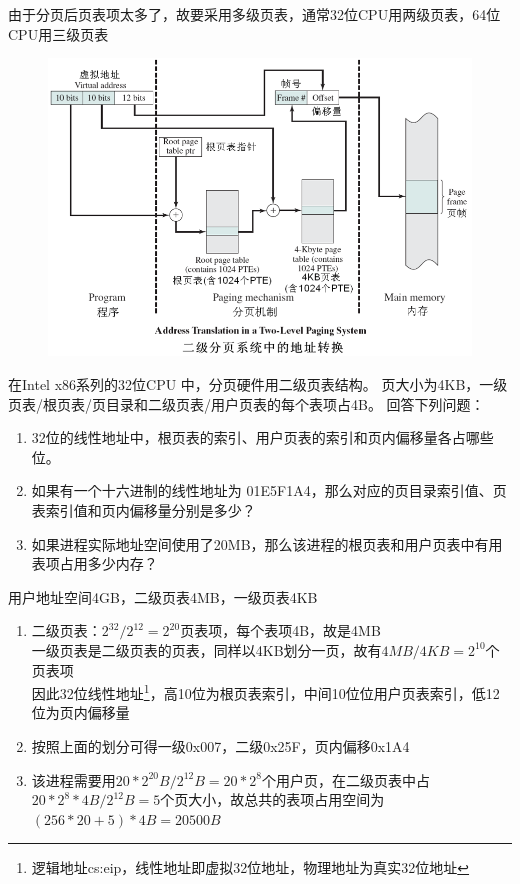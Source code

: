 由于分页后页表项太多了，故要采用多级页表，通常32位CPU用两级页表，64位CPU用三级页表
\begin{figure}[H]
    \centering
    \includegraphics[width=0.6\linewidth]{fig/two-level_paging.png}
\end{figure}
\begin{example}
    在Intel x86系列的32位CPU 中，分页硬件用二级页表结构。
    页大小为4KB，一级页表/根页表/页目录和二级页表/用户页表的每个表项占4B。
    回答下列问题：
    \begin{enumerate}
        \item 32位的线性地址中，根页表的索引、用户页表的索引和页内偏移量各占哪些位。
        \item 如果有一个十六进制的线性地址为 01E5F1A4，那么对应的页目录索引值、页表索引值和页内偏移量分别是多少？
        \item 如果进程实际地址空间使用了20MB，那么该进程的根页表和用户页表中有用表项占用多少内存？
    \end{enumerate}
\end{example}
\begin{analysis}
    用户地址空间4GB，二级页表4MB，一级页表4KB
    \begin{enumerate}
        \item 二级页表：$2^{32}/2^{12}=2^{20}$页表项，每个表项4B，故是4MB\\
        一级页表是二级页表的页表，同样以4KB划分一页，故有$4MB/4KB=2^{10}$个页表项\\
        因此32位线性地址\footnote{逻辑地址cs:eip，线性地址即虚拟32位地址，物理地址为真实32位地址}，高10位为根页表索引，中间10位位用户页表索引，低12位为页内偏移量
        \item 按照上面的划分可得一级0x007，二级0x25F，页内偏移0x1A4
        \item 该进程需要用$20*2^{20}B/2^{12}B=20*2^8$个用户页，在二级页表中占$20*2^8*4B/2^{12}B=5$个页大小，故总共的表项占用空间为$(256*20+5)*4B=20500B$
    \end{enumerate}
\end{analysis}

